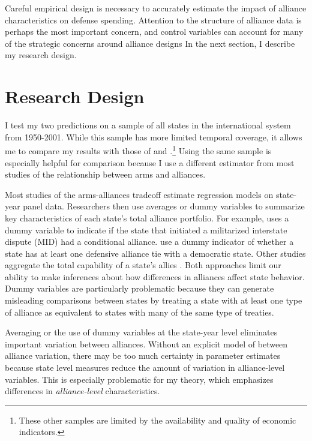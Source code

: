 \documentclass[12pt]{article}
\begin{document}
Careful empirical design is necessary to accurately estimate the impact of alliance characteristics on defense spending. Attention to the structure of alliance data is perhaps the most important concern, and control variables can account for many of the strategic concerns around alliance designs In the next section, I describe my research design. 
 

\section*{Research Design} 

I test my two predictions on a sample of all states in the international system from 1950-2001. While this sample has more limited temporal coverage, it allows me to compare my results with those of \citet{DigiuseppePoast2016} and \citet{Nordhausetal2012}.\footnote{These other samples are limited by the availability and quality of economic indicators.} Using the same sample is especially helpful for comparison because I use a different estimator from most studies of the relationship between arms and alliances. 

Most studies of the arms-alliances tradeoff estimate regression models on state-year panel data. Researchers then use averages or dummy variables to summarize key characteristics of each state's total alliance portfolio. For example, \citet{Benson2012} uses a dummy variable to indicate if the state that initiated a militarized interstate dispute (MID) had a conditional alliance. \citet{DigiuseppePoast2016} use a dummy indicator of whether a state has at least one defensive alliance tie with a democratic state. Other studies aggregate the total capability of a state's allies \citep{Nordhausetal2012}. Both approaches limit our ability to make inferences about how differences in alliances affect state behavior. Dummy variables are particularly problematic because they can generate misleading comparisons between states by treating a state with at least one type of alliance as equivalent to states with many of the same type of treaties. 

Averaging or the use of dummy variables at the state-year level eliminates important variation between alliances. Without an explicit model of between alliance variation, there may be too much certainty in parameter estimates \citep{McElreath2016} because state level measures reduce the amount of variation in alliance-level variables. This is especially problematic for my theory, which emphasizes differences in \textit{alliance-level} characteristics. 
\end{document}
